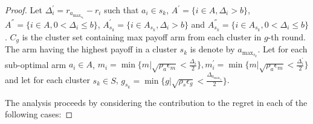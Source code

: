 \begin{proof}
Let $\Delta_{i}^{'}=r_{a_{\max_{s_{k}}}} - r_{i}$ such that $a_{i}\in s_{k}$, $A^{'}=\lbrace i \in A,\Delta_{i}> b\rbrace$,  $A^{''}=\lbrace i \in A,0 < \Delta_{i} \leq b\rbrace$, $A^{'}_{s_{k}}=\lbrace i \in A_{s_{k}},\Delta_{i}> b\rbrace$ and $A^{''}_{s_{k}}=\lbrace i \in A_{s_{k}},0 < \Delta_{i} \leq b\rbrace$. $C_{g}$ is the cluster set containing max payoff arm from each cluster in $g$-th round. The arm having the highest payoff in a cluster $s_{k}$ is denote by $a_{\max_{s_{k}}}$. Let for each sub-optimal arm $a_{i}\in A$, $m_{i}=\min{\lbrace m|\sqrt{\rho_{a}\epsilon_{m}} < \frac{\Delta_{i}}{2} \rbrace}, m_{i}^{'}=\min{\lbrace m|\sqrt{\rho_{a}\epsilon_{m}} < \frac{\Delta_{i}^{'}}{2} \rbrace}$ and let for each cluster $s_{k}\in S$, $g_{s_{k}}=\min{\lbrace g|\sqrt{\rho_{s}\epsilon_{g}} < \frac{\Delta_{a_{\max_{s_{k}}}}}{2} \rbrace}$. 

The analysis proceeds by considering the contribution to the regret in each of the following cases:


\end{proof}
